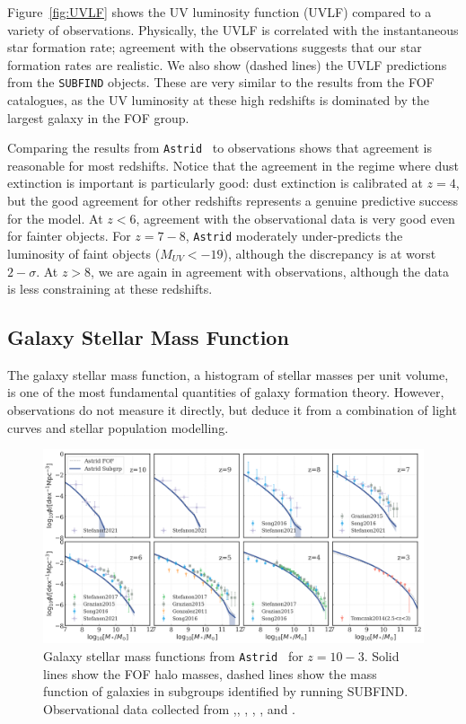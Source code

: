 \documentclass[fleqn,usenatbib]{mnras}
\def\astrid{\texttt{Astrid} }
\begin{document}
Figure~\ref{fig:UVLF} shows the UV luminosity function (UVLF) compared to a variety of observations. Physically, the UVLF is correlated with the instantaneous star formation rate; agreement with the observations suggests that our star formation rates are realistic. We also show (dashed lines) the UVLF predictions from the \texttt{SUBFIND} objects. These are very similar to the results from the FOF catalogues, as the UV luminosity at these high redshifts is dominated by the largest galaxy in the FOF group. 

Comparing the results from \astrid~to observations shows that agreement is reasonable for most redshifts. Notice that the agreement in the regime where dust extinction is important is particularly good: dust extinction is calibrated at $z=4$, but the good agreement for other redshifts represents a genuine predictive success for the model. At $z < 6$, agreement with the observational data is very good even for fainter objects. For $z=7-8$, \astrid moderately under-predicts the luminosity of faint objects ($M_{UV} < -19$), although the discrepancy is at worst \citep[comparing to ][]{Bouwens2021} $2-\sigma$. At $z > 8$, we are again in agreement with observations, although the data is less constraining at these redshifts.

\subsection{Galaxy Stellar Mass Function}
\label{sec:gsmf}

The galaxy stellar mass function, a histogram of stellar masses per unit volume, is one of the most fundamental quantities of galaxy formation theory. However, observations do not measure it directly, but deduce it from a combination of light curves and stellar population modelling. 

\begin{figure}
\centering
  \includegraphics[width=1.0\textwidth]{plots/GSMF-subfind-z10-z3.png}
  \caption{Galaxy stellar mass functions from \astrid~for $z=10-3$. Solid lines show the FOF halo masses, dashed lines show the mass function of galaxies in subgroups identified by running SUBFIND. Observational data collected from \citet{Gonzalez2011},\citet{Tomczak2014}, \citet{Grazian2015}, \citet{Song2016}, \citet{Stefanon2017}, and \citet{Stefanon2021}.}
  \label{fig:GSMF}
\end{figure}
\end{document}

